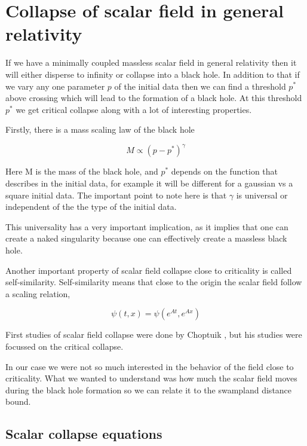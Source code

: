\chapter{Collapse of scalar field in general relativity}


If we have a minimally coupled massless scalar field in general relativity then it will either disperse to infinity or collapse into a black hole. In addition to that if we vary any one parameter $p$ of the initial data then we can find a threshold $p^*$ above crossing which will lead to the formation of a black hole. At this threshold $p^*$ we get critical collapse along with a lot of interesting properties.

Firstly, there is a mass scaling law of the black hole

\begin{equation*}
    M \propto (p - p^*)^\gamma
\end{equation*}

Here M is the mass of the black hole, and $p^*$ depends on the function that describes in the initial data, for example it will be different for a gaussian vs a square initial data. The important point to note here is that $\gamma$ is universal or independent of the the type of the initial data.

This universality has a very important implication, as it implies that one can create a naked singularity because one can effectively create a massless black hole.

Another important property of scalar field collapse close to criticality is called self-similarity. Self-similarity means that close to the origin the scalar field follow a scaling relation,

\begin{equation*}
    \psi(t,x) = \psi(e^{At},e^{Ax})
\end{equation*}

First studies of scalar field collapse were done by Choptuik \citep{Gundlach:2007gc}, but his studies were focussed on the critical collapse.

In our case we were not so much interested in the behavior of the field close to criticality. What we wanted to understand was how much the scalar field moves during the black hole formation so we can relate it to the swampland distance bound.

\section{Scalar collapse equations}


